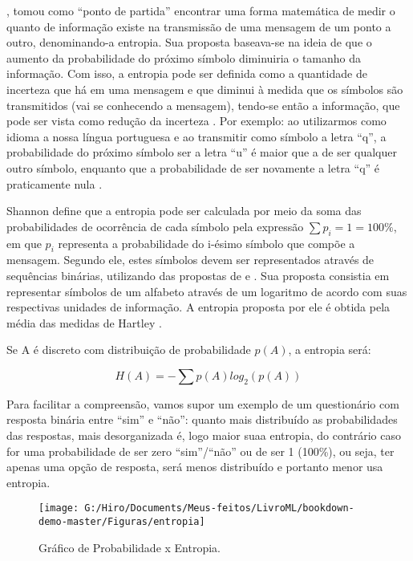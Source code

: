 \documentclass[
  openany]{book}
\begin{document}
\citet{shannon1948mathematical}, tomou como ``ponto de partida'' encontrar uma forma matemática de medir o quanto de informação existe na transmissão de uma mensagem de um ponto a outro, denominando-a entropia. Sua proposta baseava-se na ideia de que o aumento da probabilidade do próximo símbolo diminuiria o tamanho da informação. Com isso, a entropia pode ser definida como a quantidade de incerteza que há em uma mensagem e que diminui à medida que os símbolos são transmitidos (vai se conhecendo a mensagem), tendo-se então a informação, que pode ser vista como redução da incerteza \citep{shannon1948mathematical, paviotti2019consideraccoes}. Por exemplo: ao utilizarmos como idioma a nossa língua portuguesa e ao transmitir como símbolo a letra ``q'', a probabilidade do próximo símbolo ser a letra ``u'' é maior que a de ser qualquer outro símbolo, enquanto que a probabilidade de ser novamente a letra ``q'' é praticamente nula \citep{paviotti2019consideraccoes}.

Shannon define que a entropia pode ser calculada por meio da soma das probabilidades de ocorrência de cada símbolo pela expressão \(∑ p_i = 1 = 100\%\), em que \(p_i\) representa a probabilidade do i-ésimo símbolo que compõe a mensagem. Segundo ele, estes símbolos devem ser representados através de sequências binárias, utilizando das propostas de \citet{nyquist1924certain} e \citet{hartley1928transmission}. Sua proposta consistia em representar símbolos de um alfabeto através de um logaritmo de acordo com suas respectivas unidades de informação. A entropia proposta por ele é obtida pela média das medidas de Hartley \citep{moser2012student}.

Se A é discreto com distribuição de probabilidade \(p(A)\), a entropia será:

\begin{equation} 
  H(A)=- \sum p(A)log_2(p(A)) 
  \label{eq:entropia}
\end{equation}

Para facilitar a compreensão, vamos supor um exemplo de um questionário com resposta binária entre ``sim'' e ``não'': quanto mais distribuído as probabilidades das respostas, mais desorganizada é, logo maior suaa entropia, do contrário caso for uma probabilidade de ser zero ``sim''/``não'' ou de ser 1 (100\%), ou seja, ter apenas uma opção de resposta, será menos distribuído e portanto menor usa entropia.

\begin{figure}

{\centering \texttt{[image: G:/Hiro/Documents/Meus-feitos/LivroML/bookdown-demo-master/Figuras/entropia]} 

}

\caption{Gráfico de Probabilidade x Entropia.}\label{fig:entropia}
\end{figure}
\end{document}
